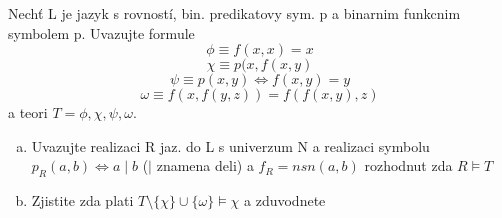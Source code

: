 \subsubsection{}
Nechť L je jazyk s rovností, bin. predikatovy sym. p a binarnim funkcnim symbolem
p. Uvazujte formule 
$$\phi \equiv f(x,x)=x$$
$$\chi \equiv p(x,f(x,y)$$
$$\psi \equiv p(x,y) \Leftrightarrow f(x,y)=y$$
$$\omega \equiv f(x,f(y,z))=f(f(x,y),z)$$
a teori $T = {\phi, \chi, \psi, \omega}$.

\begin{enumerate}[a)]
  \item Uvazujte realizaci R jaz. do L s univerzum N a realizaci symbolu
  $p_R(a,b)\Leftrightarrow a \mid b$ ($\mid$ znamena deli) a $f_R = nsn(a,b)$ rozhodnut
  zda $R \models T$
  \item Zjistite zda plati $T\setminus\{\chi\}\cup\{\omega\}\models\chi$ a
  zduvodnete
\end{enumerate}

